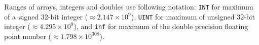 \documentclass[12pt,a4paper]{report}
\begin{document}
Ranges of arrays, integers and doubles use following notation: \verb'INT' for maximum of a~signed 32-bit integer ($\approx 2.147\times 10^9$), 
\verb'UINT' for maximum of unsigned 32-bit integer ($\approx 4.295\times 10^9$), and
\verb'inf' for maximum of the double precision floating point number ($\approx1.798\times 10^{308}$). 
\pagebreak




\printindex



\end{document}
